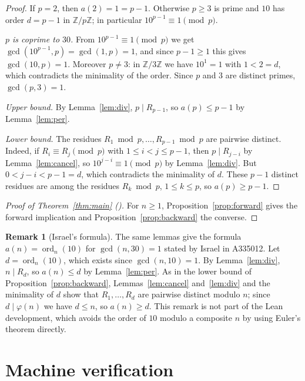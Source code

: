 \documentclass[11pt]{amsart}
\theoremstyle{plain}
\theoremstyle{definition}
\newtheorem{remark}[theorem]{Remark}
\newcommand{\Z}{\mathbb{Z}}
\DeclareMathOperator{\ord}{ord}
\begin{document}
\begin{proof}
If $p=2$, then $a(2)=1=p-1$. Otherwise $p\ge3$ is prime and $10$ has order $d=p-1$ in $\Z/p\Z$; in particular $10^{p-1}\equiv1\pmod p$.

\emph{$p$ is coprime to $30$.} From $10^{p-1}\equiv1\pmod p$ we get $\gcd(10^{p-1},p)=\gcd(1,p)=1$, and since $p-1\ge1$ this gives $\gcd(10,p)=1$. Moreover $p\ne3$: in $\Z/3\Z$ we have $10^1=1$ with $1<2=d$, which contradicts the minimality of the order. Since $p$ and $3$ are distinct primes, $\gcd(p,3)=1$.

\emph{Upper bound.} By Lemma~\ref{lem:div}, $p\mid R_{p-1}$, so $a(p)\le p-1$ by Lemma~\ref{lem:per}.

\emph{Lower bound.} The residues $R_1\bmod p,\dots,R_{p-1}\bmod p$ are pairwise distinct. Indeed, if $R_i\equiv R_j\pmod p$ with $1\le i<j\le p-1$, then $p\mid R_{j-i}$ by Lemma~\ref{lem:cancel}, so $10^{j-i}\equiv1\pmod p$ by Lemma~\ref{lem:div}. But $0<j-i<p-1=d$, which contradicts the minimality of $d$. These $p-1$ distinct residues are among the residues $R_k\bmod p$, $1\le k\le p$, so $a(p)\ge p-1$.
\end{proof}

\begin{proof}[Proof of Theorem~\ref{thm:main} ()]
For $n\ge1$, Proposition~\ref{prop:forward} gives the forward implication and Proposition~\ref{prop:backward} the converse.
\end{proof}

\begin{remark}[Israel's formula]\label{rem:israel}
The same lemmas give the formula $a(n)=\ord_n(10)$ for $\gcd(n,30)=1$ stated by Israel in A335012.
Let $d=\ord_n(10)$, which exists since $\gcd(n,10)=1$. By Lemma~\ref{lem:div}, $n\mid R_d$, so $a(n)\le d$ by Lemma~\ref{lem:per}. As in the lower bound of Proposition~\ref{prop:backward}, Lemmas~\ref{lem:cancel} and~\ref{lem:div} and the minimality of $d$ show that $R_1,\dots,R_d$ are pairwise distinct modulo $n$; since $d\mid\varphi(n)$ we have $d\le n$, so $a(n)\ge d$.
This remark is not part of the Lean development, which avoids the order of $10$ modulo a composite $n$ by using Euler's theorem directly.
\end{remark}

\section{Machine verification}\label{sec:lean}
\end{document}
